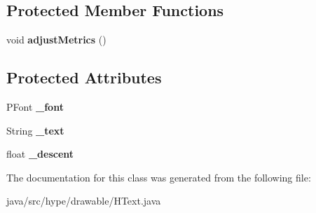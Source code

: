 \subsection*{Protected Member Functions}
\begin{DoxyCompactItemize}
\item 
\hypertarget{classhype_1_1drawable_1_1_h_text_a9453318bde7a8e17a0624fc73da871f2}{void {\bfseries adjust\-Metrics} ()}\label{classhype_1_1drawable_1_1_h_text_a9453318bde7a8e17a0624fc73da871f2}

\end{DoxyCompactItemize}
\subsection*{Protected Attributes}
\begin{DoxyCompactItemize}
\item 
\hypertarget{classhype_1_1drawable_1_1_h_text_aa55ece9860aeab65ec09852184db221a}{P\-Font {\bfseries \-\_\-font}}\label{classhype_1_1drawable_1_1_h_text_aa55ece9860aeab65ec09852184db221a}

\item 
\hypertarget{classhype_1_1drawable_1_1_h_text_a110b21b7f159962f894f70bc46e075c6}{String {\bfseries \-\_\-text}}\label{classhype_1_1drawable_1_1_h_text_a110b21b7f159962f894f70bc46e075c6}

\item 
\hypertarget{classhype_1_1drawable_1_1_h_text_a35e53327d521ba4a19714923ec9b5cd2}{float {\bfseries \-\_\-descent}}\label{classhype_1_1drawable_1_1_h_text_a35e53327d521ba4a19714923ec9b5cd2}

\end{DoxyCompactItemize}


The documentation for this class was generated from the following file\-:\begin{DoxyCompactItemize}
\item 
java/src/hype/drawable/H\-Text.\-java\end{DoxyCompactItemize}
